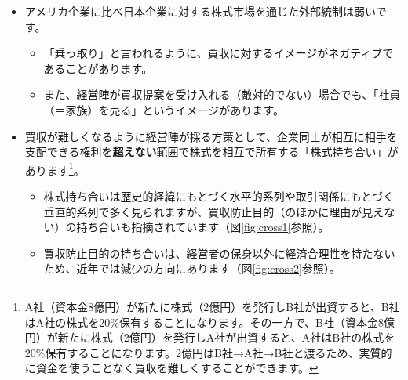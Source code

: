 \documentclass[
]{book}
\begin{document}
\begin{itemize}
\item
  アメリカ企業に比べ日本企業に対する株式市場を通じた外部統制は弱いです。

  \begin{itemize}
  \item
    「乗っ取り」と言われるように、買収に対するイメージがネガティブであることがあります。
  \item
    また、経営陣が買収提案を受け入れる（敵対的でない）場合でも、「社員（＝家族）を売る」というイメージがあります。
  \end{itemize}
\item
  買収が難しくなるように経営陣が採る方策として、企業同士が相互に相手を支配できる権利を\textbf{超えない}範囲で株式を相互で所有する「株式持ち合い」があります\footnote{A社（資本金8億円）が新たに株式（2億円）を発行しB社が出資すると、B社はA社の株式を20\%保有することになります。その一方で、B社（資本金8億円）が新たに株式（2億円）を発行しA社が出資すると、A社はB社の株式を20\%保有することになります。2億円はB社→A社→B社と渡るため、実質的に資金を使うことなく買収を難しくすることができます。}。

  \begin{itemize}
  \item
    株式持ち合いは歴史的経緯にもとづく水平的系列や取引関係にもとづく垂直的系列で多く見られますが、買収防止目的（のほかに理由が見えない）の持ち合いも指摘されています（図\ref{fig:cross1}参照）。
  \item
    買収防止目的の持ち合いは、経営者の保身以外に経済合理性を持たないため、近年では減少の方向にあります（図\ref{fig:cross2}参照）。
  \end{itemize}
\end{itemize}
\end{document}
